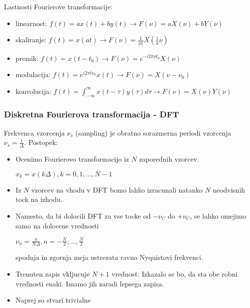 \documentclass{article}
\begin{document}
\begin{multicols}{4}
Lastnosti Fourierove transformacije:
\begin{itemize}
    \item linearnost: $f(t) = ax(t) + by(t) \rightarrow F(\nu) = a X(\nu) + bY(\nu)$
    \item skaliranje: $f(t) = x(at) \rightarrow F(\nu) = \frac{1}{|a|} X(\frac{1}{a} \nu)$
    \item premik: $f(t) = x(t - t_0) \rightarrow F(\nu) = e^{-i2\pi \nu t_0} X(\nu)$
    \item modulacija: $f(t) = e^{i 2 \pi t \nu_0} x(t) \rightarrow F(\nu) = X(\nu - \nu_0)$
    \item konvolucija: $f(t) = \int_{- \infty}^{\infty} x(t - \tau)y(\tau) d\tau \rightarrow F(\nu) = X(\nu) Y(\nu)$
\end{itemize}

\subsubsection{Diskretna Fourierova transformacija - DFT}
Frekvenca vzorcenja $\nu_s $ (sampling) je obratno sorazmerna periodi vzorcenja $\nu_s = \frac{1}{\Delta}$.
Postopek:
\begin{itemize}
    \item Ocenimo Fourierovo transformacijo iz $N$ zaporednih vzorcev.
        \begin{center}
            \begin{math}
                x_k = x(k \Delta), k = 0,1, \dots, N - 1
            \end{math}
        \end{center}
    \item Iz $N$ vzorcev na vhodu v DFT bomo lahko izracunali natanko $N$ neodvisnih tock na izhodu.
    \item Namesto, da bi dolocili DFT za vse tocke od $- \nu_C$ do $+ \nu_C$, se lahko omejimo samo 
        na dolocene vrednosti
        \begin{center}
            \begin{math}
                \nu_n = \frac{n}{N \Delta}, n = - \frac{N}{2}, \dots, \frac{N}{2}
            \end{math}
        \end{center}
        spodnja in zgornja meja ustrezata ravno Nyquistovi frekvenci.
    \item Trenuten zapis vkljucuje $N + 1$ vrednost. Izkazalo se bo, da sta obe robni vrednosti enaki. Imamo
        jih zaradi lepsega zapisa.
    \item Naprej so stvari trivialne

\end{itemize}
\end{multicols}
\end{document}
